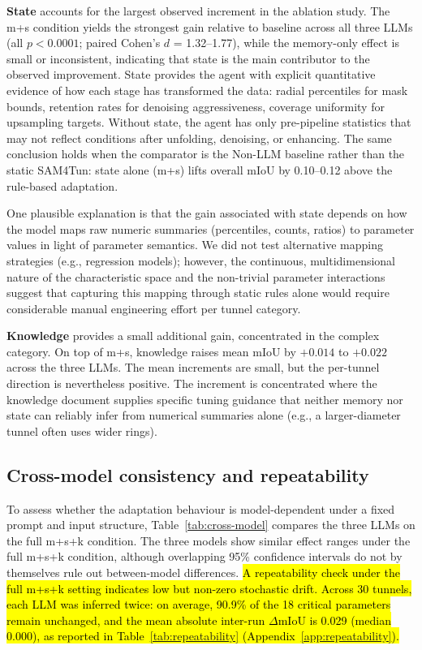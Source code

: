 \documentclass[a4paper,fleqn]{cas-dc}
\begin{document}
{\textbf{State} accounts for the largest observed increment in the ablation study. The m+s condition yields the strongest gain relative to baseline across all three LLMs (all $p < 0.0001$; paired Cohen's \mbox{$d$} = 1.32--1.77), while the memory-only effect is small or inconsistent, indicating that state is the main contributor to the observed improvement. State provides the agent with explicit quantitative evidence of how each stage has transformed the data: radial percentiles for mask bounds, retention rates for denoising aggressiveness, coverage uniformity for upsampling targets. Without state, the agent has only pre-pipeline statistics that may not reflect conditions after unfolding, denoising, or enhancing. The same conclusion holds when the comparator is the Non-LLM baseline rather than the static SAM4Tun: state alone (m+s) lifts overall mIoU by 0.10--0.12 above the rule-based adaptation.


One plausible explanation is that the gain associated with state depends on how the model maps raw numeric summaries (percentiles, counts, ratios) to parameter values in light of parameter semantics. We did not test alternative mapping strategies (e.g., regression models); however, the continuous, multidimensional nature of the characteristic space and the non-trivial parameter interactions suggest that capturing this mapping through static rules alone would require considerable manual engineering effort per tunnel category.

\textbf{Knowledge} provides a small additional gain, concentrated in the complex category. On top of m+s, knowledge raises mean mIoU by $+0.014$ to $+0.022$ across the three LLMs. The mean increments are small, but the per-tunnel direction is nevertheless positive. The increment is concentrated where the knowledge document supplies specific tuning guidance that neither memory nor state can reliably infer from numerical summaries alone (e.g.,  a larger-diameter tunnel often uses wider rings).


\subsection{Cross-model consistency and repeatability}\label{sec:consistency}

To assess whether the adaptation behaviour is model-dependent under a fixed prompt and input structure, Table~\ref{tab:cross-model} compares the three LLMs on the full m+s+k condition. The three models show similar effect ranges under the full m+s+k condition, although overlapping 95\% confidence intervals do not by themselves rule out between-model differences.
\hl{A repeatability check under the full \mbox{m+s+k} setting indicates low but non-zero stochastic drift. Across 30 tunnels, each LLM was inferred twice: on average, 90.9\% of the 18 critical parameters remain unchanged, and the mean absolute inter-run \mbox{$\Delta$}mIoU is 0.029 (median 0.000), as reported in Table~\ref{tab:repeatability} (Appendix~\ref{app:repeatability}).}

}
\end{document}
